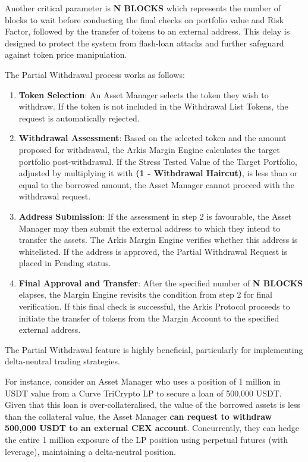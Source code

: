 \documentclass[conference]{IEEEtran}
\begin{document}
Another critical parameter is \textbf{N BLOCKS} which represents the number of blocks to wait before conducting the final checks on portfolio value and Risk Factor, followed by the transfer of tokens to an external address. This delay is designed to protect the system from flash-loan attacks and further safeguard against token price manipulation.

The Partial Withdrawal process works as follows:
\begin{enumerate}
	\item \textbf{Token Selection}: An Asset Manager selects the token they wish to withdraw. If the token is not included in the Withdrawal List Tokens, the request is automatically rejected.
	\item \textbf{Withdrawal Assessment}: Based on the selected token and the amount proposed for withdrawal, the Arkis Margin Engine calculates the target portfolio post-withdrawal. If the Stress Tested Value of the Target Portfolio, adjusted by multiplying it with \textbf{(1 - Withdrawal Haircut)}, is less than or equal to the borrowed amount, the Asset Manager cannot proceed with the withdrawal request.
	\item \textbf{Address Submission}: If the assessment in step 2 is favourable, the Asset Manager may then submit the external address to which they intend to transfer the assets. The Arkis Margin Engine verifies whether this address is whitelisted. If the address is approved, the Partial Withdrawal Request is placed in Pending status.
	\item \textbf{Final Approval and Transfer}: After the specified number of \textbf{N BLOCKS} elapses, the Margin Engine revisits the condition from step 2 for final verification. If this final check is successful, the Arkis Protocol proceeds to initiate the transfer of tokens from the Margin Account to the specified external address.

\end{enumerate}



The Partial Withdrawal feature is highly beneficial, particularly for implementing delta-neutral trading strategies. 

For instance, consider an Asset Manager who uses a position of 1 million in USDT value from a Curve TriCrypto LP to secure a loan of 500,000 USDT. Given that this loan is over-collateralised, the value of the borrowed assets is less than the collateral value, the Asset Manager \textbf{can request to withdraw 500,000 USDT to an external CEX account}. Concurrently, they can hedge the entire 1 million exposure of the LP position using perpetual futures (with leverage), maintaining a delta-neutral position. 
\end{document}
